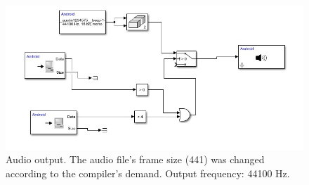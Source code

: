 \documentclass[12pt,a4paper]{article}
\begin{document}
\begin{figure}[h]
    \centering
    \includegraphics[width=\textwidth]{files/AudioOutput.jpeg}
    \caption{Audio output. The audio file's frame size (441) was changed according to the compiler's demand. Output frequency: 44100 Hz.}
    \label{fig:AO}
\end{figure}
\end{document}
